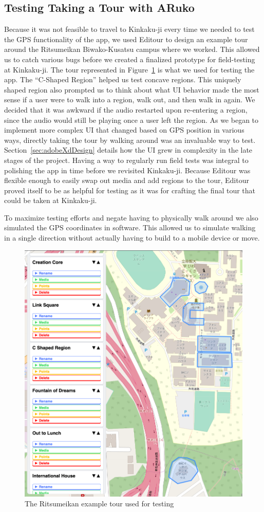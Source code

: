 \documentclass[a4paper, 10pt, american, titlepage]{article}
\begin{document}
\subsection{Testing Taking a Tour with ARuko}
\label{sec:testingARuko}

Because it was not feasible to travel to Kinkaku-ji every time we needed to test
the GPS functionality of the app, we used Editour to design an example tour
around the Ritsumeikan Biwako-Kusatsu campus where we worked. This allowed us to
catch various bugs before we created a finalized prototype for field-testing at
Kinkaku-ji. The tour represented in Figure~\ref{fig:ritsuTour} is what we used
for testing the app. The ``C-Shaped Region'' helped us test concave regions.
This uniquely shaped region also prompted us to think about what UI behavior
made the most sense if a user were to walk into a region, walk out, and then
walk in again. We decided that it was awkward if the audio restarted upon
re-entering a region, since the audio would still be playing once a user left
the region. As we began to implement more complex UI that changed based on GPS
position in various ways, directly taking the tour by walking around was an
invaluable way to test. Section~\ref{sec:adobeXdDesign} details how the UI grew
in complexity in the late stages of the project. Having a way to regularly run
field tests was integral to polishing the app in time before we revisited
Kinkaku-ji. Because Editour was flexible enough to easily swap out media and add
regions to the tour, Editour proved itself to be as helpful for testing as it
was for crafting the final tour that could be taken at Kinkaku-ji.

To maximize testing efforts and negate having to physically walk around we also
simulated the GPS coordinates in software. This allowed us to simulate walking
in a single direction without actually having to build to a mobile device or
move.

\begin{figure}[h]
	\centering
	\includegraphics[width=.5\textwidth]{ritsu-tour.png}
	\caption{The Ritsumeikan example tour used for testing}
	\label{fig:ritsuTour}
\end{figure}
\end{document}
